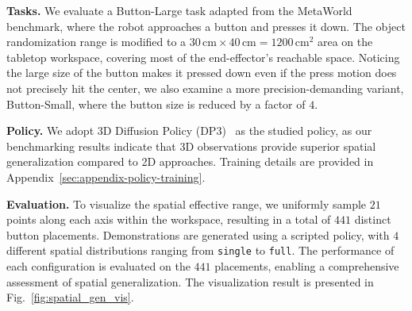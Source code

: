\vspace{0.2cm} \noindent\textbf{Tasks.} 
We evaluate a Button-Large task adapted from the MetaWorld~\cite{yu2020metaworld} benchmark, where the robot approaches a button and presses it down. The object randomization range is modified to a $30\,\mathrm{cm} \times 40\,\mathrm{cm} = 1200\,\mathrm{cm}^2$ area on the tabletop workspace, covering most of the end-effector’s reachable space. Noticing the large size of the button makes it pressed down even if the press motion does not precisely hit the center, we also examine a more precision-demanding variant, Button-Small, where the button size is reduced by a factor of $4$. 

\vspace{0.2cm}\noindent\textbf{Policy.} 
We adopt 3D Diffusion Policy (DP3)~\cite{ze20243d} as the studied policy, as our benchmarking results indicate that 3D observations provide superior spatial generalization compared to 2D approaches. Training details are provided in Appendix~\ref{sec:appendix-policy-training}.

\vspace{0.2cm} \noindent\textbf{Evaluation.} 
To visualize the spatial effective range, we uniformly sample $21$ points along each axis within the workspace, resulting in a total of $441$ distinct button placements. Demonstrations are generated using a scripted policy, with $4$ different spatial distributions ranging from \texttt{single} to \texttt{full}. The performance of each configuration is evaluated on the $441$ placements, enabling a comprehensive assessment of spatial generalization. The visualization result is presented in Fig.~\ref{fig:spatial_gen_vis}.

